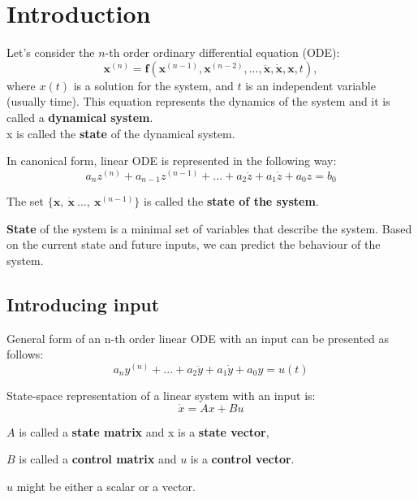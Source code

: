 
\section{Introduction}
\begin{tcolorbox}[colback=green!10,colframe=green!50!black,title=\textbf{Dynamical systems}]
    Let's consider the \(n\)-th order ordinary differential equation (ODE):
    \[
    \mathbf{x}^{(n)} = \mathbf{f}(\mathbf{x}^{(n-1)}, \mathbf{x}^{(n-2)}, ..., \ddot{\mathbf{x}}, \dot{\mathbf{x}}, \mathbf{x}, t),
    \]
    where \(x(t)\) is a solution for the system, and \(t\) is an independent variable (usually time).
    This equation represents the dynamics of the system and it is called a \textbf{dynamical system}.\\
    x is called the \textbf{state} of the dynamical system.
\end{tcolorbox}


In canonical form, linear ODE is represented in the following way:
\[a_{n}z^{(n)} +a_{n-1}z^{(n-1)}+...+a_{2}\ddot z+a_{1}\dot z + a_0 z= b_0\]

The set $\{ \mathbf{x}, \ \dot{\mathbf{x}} \ ..., \ \mathbf{x}^{(n-1)} \}$ is called the \textbf{state  of the system}.

\textbf{State} of the system is a minimal set of variables that describe the system. Based on the current state and future inputs,
we can predict the behaviour of the system. \\

\subsection{Introducing input}
General form of an n-th order linear ODE with an input can be presented as follows:
%
\begin{equation}
    a_n y^{(n)} + 
    ... +
    a_2 \ddot{y} + a_1 \dot{y} + 
    a_0 y = u(t)
\end{equation}

\bigskip

State-space representation of a linear system with an input is:
%
\begin{equation}
    \dot x = Ax + Bu
\end{equation}

$A$ is called a \textbf{state matrix} and x is a \textbf{state vector}, 

$B$ is called a \textbf{control matrix} and $u$ is a \textbf{control vector}.

$u$ might be either a scalar or a vector.

